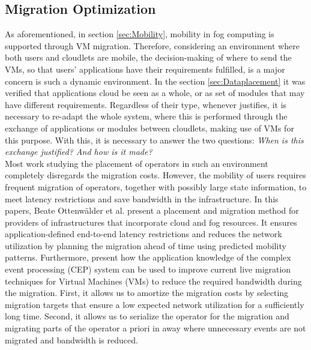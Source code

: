 \subsection{Migration Optimization}
\label{sec:Migration}
As aforementioned, in section \ref{sec:Mobility}, mobility in fog computing is supported through VM migration. Therefore, considering an environment where both users and cloudlets are mobile, the decision-making of where to send the VMs, so that users' applications have their requirements fulfilled, is a major concern is such a dynamic environment. In the section \ref{sec:Dataplacement} it was verified that applications cloud be seen as a whole, or as set of modules that may have different requirements. Regardless of their type, whenever justifies, it is necessary to re-adapt the whole system, where this is performed through the exchange of applications or modules between cloudlets, making use of VMs for this purpose. With this, it is necessary to answer the two questions: \textit{When is this exchange justified? And how is it made?}\\

\cite{ottenwalder2013migcep}
Most work studying the placement of operators in such an environment completely disregards the migration costs. However, the mobility of users requires frequent migration of operators, together with possibly large state information, to meet latency restrictions and save bandwidth in the infrastructure. In this papers, Beate Ottenwälder et al. present a placement and migration method for providers of infrastructures that incorporate cloud and fog resources. It ensures application-defined end-to-end latency restrictions and reduces the network utilization by planning the migration ahead of time using predicted mobility patterns. Furthermore, present how the application knowledge of the complex event processing (CEP) system can be used to improve current live migration techniques for Virtual Machines (VMs) to reduce the required bandwidth during the migration. First, it allows us to amortize the migration costs by selecting migration targets that ensure a low expected network utilization for a sufficiently long time. Second, it allows us to serialize the operator for the migration and migrating parts of the operator a priori in away where unnecessary events are not migrated and bandwidth is reduced.\\


